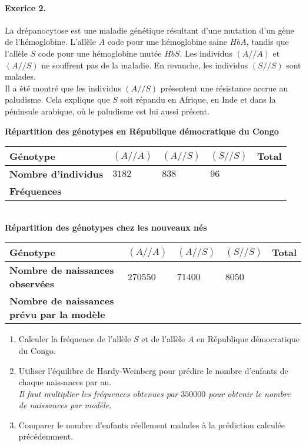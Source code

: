 \documentclass[11pt]{article}
\begin{document}
\paragraph{Exerice 2.}
La drépanocytose est une maladie génétique résultant d'une mutation d'un gène de
l'hémoglobine. L'allèle $A$ code pour une hémoglobine saine $HbA$, tandis que
l'allèle $S$ code pour une hémoglobine mutée $HbS$. Les individus $(A//A)$ et
$(A//S)$ ne souffrent pas de la maladie. En revanche, les individus $(S//S)$
sont malades.\\
Il a été montré que les individus $(A//S)$ présentent une résistance accrue au
paludisme. Cela explique que $S$ soit répandu en Afrique, en Inde et dans la
péninsule arabique, où le paludisme est lui aussi présent.
\begin{center}
		\textbf{Répartition des génotypes en République démocratique du Congo}\\
		\vspace{11pt}
		\renewcommand{\arraystretch}{2}
		\begin{tabular}{|>{\centering\arraybackslash}m{2.5cm}|>{\centering\arraybackslash}m{1.5cm}|>{\centering\arraybackslash}m{1.5cm}|>{\centering\arraybackslash}m{1.5cm}|>{\centering\arraybackslash}m{1.5cm}|}
			\hline
			\textbf{Génotype}&$(A//A)$&$(A//S)$&$(S//S)$&Total\\
			\hline
			\textbf{Nombre d'individus}&$ {3182} $&$ 838 $&$ 96 $& \\
			\hline
			\textbf{Fréquences}& & & & \\
			\hline
		\end{tabular}\\
		\vspace{11pt}
		\textbf{Répartition des génotypes chez les nouveaux nés}\\
		\vspace{11pt}
		\begin{tabular}{|>{\centering\arraybackslash}m{4.5cm}|>{\centering\arraybackslash}m{1.5cm}|>{\centering\arraybackslash}m{1.5cm}|>{\centering\arraybackslash}m{1.5cm}|>{\centering\arraybackslash}m{1.5cm}|}
			\hline
			\textbf{Génotype}&$(A//A)$&$(A//S)$&$(S//S)$&Total\\
			\hline
			\textbf{Nombre de naissances observées}  &$ {270550} $&${71400}$&${8050}$& \\
			\hline
			\textbf{Nombre de naissances prévu par la modèle}& & & & \\
			\hline
		\end{tabular}
	\end{center}
\begin{enumerate}
	\item Calculer la fréquence de l'allèle $S$ et de l'allèle $A$ en République démocratique du Congo.
	\item Utiliser l'équilibre de Hardy-Weinberg pour prédire le nombre d'enfants de chaque naissances par an.\\
	\textit{Il faut multiplier les fréquences obtenues par ${350000}$ pour obtenir le nombre de naissances par modèle. }
	\item Comparer le nombre d'enfants réellement malades à la prédiction calculée précédemment.
\end{enumerate}
\end{document}
